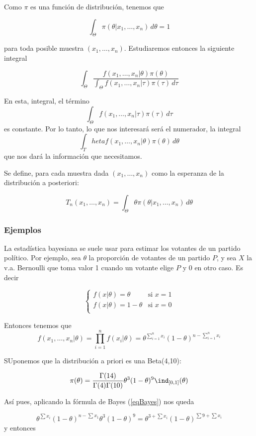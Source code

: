 \documentclass{apuntes}
\begin{document}
Como $\pi$ es una función de distribución, tenemos que 

\[ \int_\Theta \pi(\theta|x_1,\dotsc,x_n)\,d\theta = 1 \]

para toda posible muestra $(x_1,\dotsc,x_n)$. Estudiaremos entonces la siguiente integral

\[ \int_\Theta \frac{f(x_1,\dotsc,x_n|\theta)\pi(\theta)}{\displaystyle \int_\Theta f(x_1,\dotsc,x_n|\tau)\pi(\tau)\,d\tau} \]

En esta, integral, el término \[ \int_\Theta f(x_1,\dotsc,x_n|\tau)\pi(\tau)\,d\tau \] es constante. Por lo tanto, lo que nos interesará será el numerador, la integral \[ \int_Theta f(x_1,\dotsc,x_n|\theta)\pi(\theta)\,d\theta \] que nos dará la información que necesitamos.

\begin{defn} Se define, para cada muestra dada $(x_1,\dotsc,x_n)$ como la esperanza de la distribución a posteriori:

\[ T_n(x_1,\dotsc,x_n) = \int_\Theta \theta\pi(\theta|x_1,\dotsc,x_n)\,d\theta \]
\end{defn}


\subsubsection{Ejemplos}

La estadística bayesiana se suele usar para estimar los votantes de un partido político. Por ejemplo, sea $\theta$ la proporción de votantes de un partido $P$, y sea $X$ la v.a. Bernoulli que toma valor 1 cuando un votante elige $P$ y 0 en otro caso. Es decir

\[ \begin{cases}
f(x|\theta) = \theta &\text{si } x=1 \\
f(x|\theta) = 1 - \theta &\text{si } x=0 \\
\end{cases} \]

Entonces tenemos que \[ f(x_1,\dotsc,x_n|\theta) = \prod_{i=1}^n f(x_i|\theta) = \theta^{\sum_{i=1}^n x_i} (1-\theta)^{n -\sum_{i=1}^n x_i} \]

SUponemos que la distribución a priori es una Beta(4,10):

\[ \pi(\theta) = \frac{\Gamma(14)}{\Gamma(4)\Gamma(10)}\theta^3(1-\theta)^9\ind_{[0,1]}(\theta) \]

Así pues, aplicando la fórmula de Bayes (\ref{eqBayes}) nos queda 

\begin{equation}\label{eqE1}
\theta^{\sum x_i}(1-\theta)^{n-\sum x_1} \theta^3 (1-\theta)^9 = \theta^{3+\sum x_i} (1-\theta)^{\sum 9 + \sum x_i} 
\end{equation} y entonces
\end{document}
